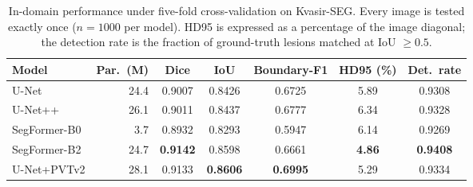 \begin{table}[t]
\centering
\footnotesize
\caption{In-domain performance under five-fold cross-validation on Kvasir-SEG. Every image is tested exactly once ($n=1000$ per model). HD95 is expressed as a percentage of the image diagonal; the detection rate is the fraction of ground-truth lesions matched at IoU $\geq 0.5$.}
\label{tab:indomain}
\begin{tabular}{lrccccc}
\toprule
Model & Par.\ (M) & Dice & IoU & Boundary-F1 & HD95 (\%) & Det.\ rate \\
\midrule
U-Net & 24.4 & 0.9007 & 0.8426 & 0.6725 & 5.89 & 0.9308 \\
U-Net++ & 26.1 & 0.9011 & 0.8437 & 0.6777 & 6.34 & 0.9328 \\
SegFormer-B0 & 3.7 & 0.8932 & 0.8293 & 0.5947 & 6.14 & 0.9269 \\
SegFormer-B2 & 24.7 & \textbf{0.9142} & 0.8598 & 0.6661 & \textbf{4.86} & \textbf{0.9408} \\
U-Net+PVTv2 & 28.1 & 0.9133 & \textbf{0.8606} & \textbf{0.6995} & 5.29 & 0.9334 \\
\bottomrule
\end{tabular}
\end{table}
